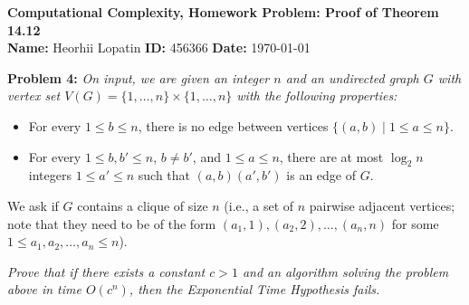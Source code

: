 \documentclass[12pt]{article}
\newcommand{\assignmentTitle}{Computational Complexity, Homework Problem: Proof of Theorem 14.12}
\newcommand{\studentName}{Heorhii Lopatin}
\newcommand{\studentID}{456366}
\newcommand{\submissionDate}{\today}
\newenvironment{problem}[1]{\noindent\textbf{Problem #1:} \itshape}{\par\vspace{10pt}}
\begin{document}
\begin{center}
    {\Large \textbf{\assignmentTitle}}
    \\[10pt]
    \textbf{Name:} \studentName \hspace{1cm} \textbf{ID:} \studentID \hspace{1cm} \textbf{Date:} \submissionDate
\end{center}

\vspace{20pt}

\begin{problem}{4}
On input, we are given an integer \( n \) and an undirected graph \( G \) with vertex set \( V(G) = \{1, \ldots, n\} \times \{1, \ldots, n\} \) with the following properties:
\begin{itemize}
    \item For every \( 1 \leq b \leq n \), there is no edge between vertices \( \{(a, b) \mid 1 \leq a \leq n\} \).
    \item For every \( 1 \leq b, b' \leq n \), \( b \neq b' \), and \( 1 \leq a \leq n \), there are at most \( \log_2 n \) integers \( 1 \leq a' \leq n \) such that \( (a, b)(a', b') \) is an edge of \( G \).
\end{itemize}
We ask if \( G \) contains a clique of size \( n \) (i.e., a set of \( n \) pairwise adjacent vertices; note that they need to be of the form \( (a_1, 1), (a_2, 2), \ldots, (a_n, n) \) for some \( 1 \leq a_1, a_2, \ldots, a_n \leq n \)).

\textit{Prove that if there exists a constant \( c > 1 \) and an algorithm solving the problem above in time \( O(c^n) \), then the Exponential Time Hypothesis fails.}
\end{problem}

\vspace{20pt}

\vspace{20pt}
\end{document}

